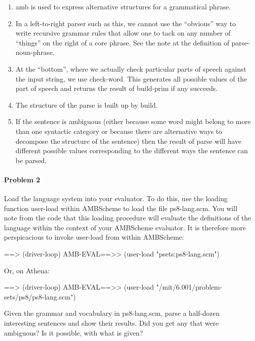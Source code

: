 \begin{enumerate}
\item {\cf amb} is used to express alternative structures for a grammatical
      phrase.
\item In a left-to-right parser such as this, we cannot use the ``obvious'' way
      to write recursive grammar rules that allow one to tack on any number of
      ``things'' on the right of a core phrase.  See the note at the definition
      of {\cf parse-noun-phrase}.
\item At the ``bottom'', where we actually check particular parts of speech
      against the input string, we use {\cf check-word}.  This generates all
      possible values of the part of speech and returns the result of
      {\cf build-prim} if any succeeds.
\item The structure of the parse is built up by {\cf build}.
\item If the sentence is ambiguous (either because some word might belong to
      more than one syntactic category or because there are alternative ways to
      decompose the structure of the sentence) then the result of {\cf parse}
      will have different possible values corresponding to the different ways
      the sentence can be parsed.
\end{enumerate}

\paragraph{Problem 2}

Load the language system into your evaluator.  To do this, use the
loading function {\cf user-load} within {\sc AMBScheme} to load the
file {\cf ps8-lang.scm}.  You will
note from the code that this loading procedure will evaluate the
definitions of the language within the context of your {\sc AMBScheme} evaluator.
It is therefore more perspicacious to invoke {\cf user-load} from within {\sc
AMBScheme}:


\beginlisp
==> (driver-loop)
AMB-EVAL==>> (user-load "psets:ps8-lang.scm")
\endlisp

Or, on Athena:

\beginlisp
==> (driver-loop)
AMB-EVAL==>> (user-load "/mit/6.001/problem-sets/ps8/ps8-lang.scm")
\endlisp

Given the grammar and vocabulary in {\cf ps8-lang.scm}, parse a half-dozen
interesting sentences and show their results.  Did you get any that were
ambiguous?  Is it possible, with what is given?

